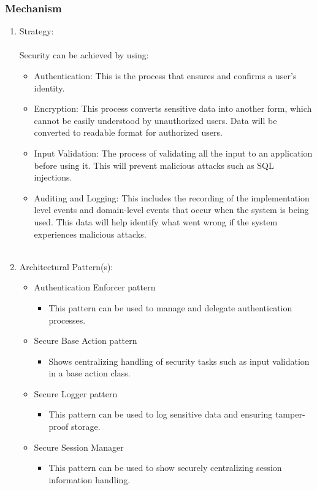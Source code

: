 	\subsubsection*{Mechanism}
		\begin{enumerate}
			\item Strategy:\\\\
			Security can be achieved by using:
			\begin{itemize}
			\item Authentication: This is the process that ensures and confirms a user’s identity.
			\item Encryption: This process converts sensitive data into another form, which cannot be easily understood by unauthorized users. Data will be converted to readable format for authorized users.
			\item Input Validation: The process of validating all the input to an application before using it. This will prevent malicious attacks such as SQL injections.
			\item Auditing and Logging: This includes the recording of the implementation level events and domain-level events that occur when the system is being used. This data will help identify what went wrong if the system experiences malicious attacks.\\\\
			
			 \end{itemize}
			\item Architectural Pattern(s):
			\begin{itemize}
			\item Authentication Enforcer pattern
				\begin{itemize}
					\item This pattern can be used to manage and delegate authentication processes.
				 \end{itemize}
			\item Secure Base Action pattern
				\begin{itemize}
					\item Shows centralizing handling of security tasks such as input validation in a base action class.
				 \end{itemize}
			\item Secure Logger pattern
				\begin{itemize}
					\item This pattern can be used to log sensitive data and ensuring tamper-proof storage.
				 \end{itemize}
			\item Secure Session Manager
				\begin{itemize}
					\item This pattern can be used to show securely centralizing session information handling.
				 \end{itemize}
			 \end{itemize}
		\end{enumerate}
